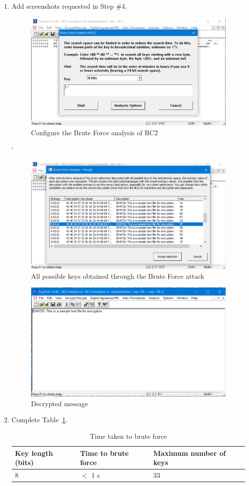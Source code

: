 \documentclass[11pt,letterpaper]{article}
\newenvironment{answer}{\em \color{blue} \begin{adjustwidth}{1cm}{1cm}}{\end{adjustwidth}}
\begin{document}
\begin{enumerate}
		\item Add screenshots requested in Step \#4.
		\begin{answer}
			\begin{figure}[H]
				\centering
				\includegraphics[width=0.6\columnwidth]{images/p2_q2_1}
				\caption{Configure the Brute Force analysis of RC2} \label{fig:dec-step-1}
			\end{figure}
			
			`\begin{figure}[H]
				\centering
				\includegraphics[width=0.6\columnwidth]{images/p2_q2_2}
				\caption{All possible keys obtained through the Brute Force attack} \label{fig:dec-step-2}
			\end{figure}
			
			\begin{figure}[H]
				\centering
				\includegraphics[width=0.6\columnwidth]{images/p2_q2_3}
				\caption{Decrypted message} \label{fig:dec-step-3}
			\end{figure}
		\end{answer}
	
	
		\item Complete Table~\ref{tab:time-taken-to-bruteforce}.
		\begin{table}[h!]
			\caption{Time taken to brute force} \label{tab:time-taken-to-bruteforce}
			\begin{tabularx}{\columnwidth}{|p{4cm}|X|X|}
				\hline
				\textbf{Key length (bits)} & \textbf{Time to brute force} & \textbf{Maximum number of keys} \\
				\hline
				8 &  $<$ 1 s& 33\\\hline
				

\end{tabularx}
\end{table}
\end{enumerate}
\end{document}
